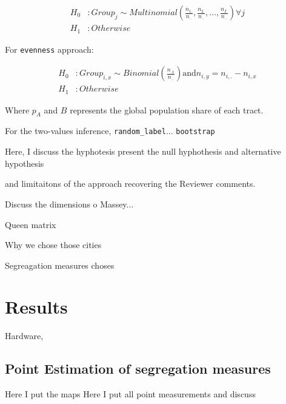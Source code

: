 \documentclass[12pt,a4paper]{article}
\begin{document}
\begin{align*}
    H_0 &: Group_j \sim Multinomial\left(\frac{n_{1.}}{n_{..}}, \frac{n_{2.}}{n_{..}}, ..., \frac{n_{I.}}{n_{..}}\right) \forall j \\
    H_1 &: Otherwise
\end{align*}


For \texttt{evenness} approach:

\begin{align*}
    H_0 &: Group_{i,x} \sim Binomial(\frac{n_{.x}}{n_{..}}) \text{and} n_{i,y} = n_{i,.} - n_{i,x}\\
    H_1 &: Otherwise
\end{align*}

Where $p_A$ and $B$ represents the global population share of each tract.

For the two-values inference, \texttt{random\_label}... \texttt{bootstrap}




Here, I discuss the hyphotesis present the null hyphothesis and alternative hypothesis

and limitaitons of the approach recovering the Reviewer comments.

Discuss the dimensions o Massey...

Queen matrix

Why we chose those cities

Segreagation measures choses

\section{Results}\label{subsec:results}

Hardware, 

\subsection{Point Estimation of segregation measures}\label{subsec:point-est}


Here I put the maps
Here I put all point measurements and discuss
\end{document}
